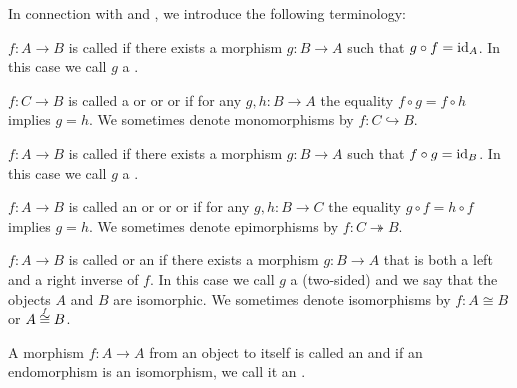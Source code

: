 \begin{definition}\label{def:morphism_invertibility}
  In connection with  and , we introduce the following terminology:
  \begin{thmenum}
     \( f: A \to B \) is called  if there exists a morphism \( g: B \to A \) such that \( g \circ f = \operatorname{id}_A \). In this case we call \( g \) a .

     \( f: C \to B \) is called a  or  or  or  if for any \( g, h: B \to A \) the equality \( f \circ g = f \circ h \) implies \( g = h \). We sometimes denote monomorphisms by \( f: C \hookrightarrow B \).

     \( f: A \to B \) is called  if there exists a morphism \( g: B \to A \) such that \( f \circ g = \operatorname{id}_B \). In this case we call \( g \) a .

     \( f: A \to B \) is called an  or  or  or  if for any \( g, h: B \to C \) the equality \( g \circ f = h \circ f \) implies \( g = h \). We sometimes denote epimorphisms by \( f: C \twoheadrightarrow B \).

     \( f: A \to B \) is called  or an  if there exists a morphism \( g: B \to A \) that is both a left and a right inverse of \( f \). In this case we call \( g \) a (two-sided)  and we say that the objects \( A \) and \( B \) are isomorphic. We sometimes denote isomorphisms by \( f: A \cong B \) or \( A \reloset f \cong B \).

     A morphism \( f: A \to A \) from an object to itself is called an  and if an endomorphism is an isomorphism, we call it an .
  \end{thmenum}
\end{definition}

